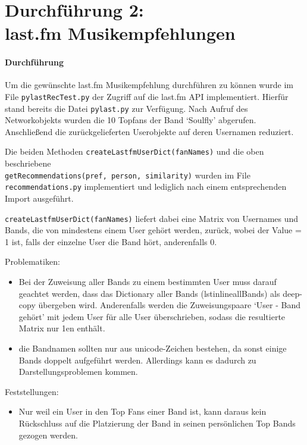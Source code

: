 \documentclass[12pt,a4paper]{scrartcl}
\begin{document}
\part*{Durchf\"uhrung 2: \\last.fm Musikempfehlungen}

\subsection*{Durchf\"uhrung}

Um die gew\"unschte last.fm Musikempfehlung durchf\"uhren zu k\"onnen wurde im File \lstinline{pylastRecTest.py} der Zugriff auf die last.fm API implementiert.
Hierf\"ur stand bereits die Datei \lstinline{pylast.py} zur Verf\"ugung. Nach Aufruf des Networkobjekts wurden die 10 Topfans der Band `Soulfly' abgerufen.
Anschlie\ss end die zur\"uckgelieferten Userobjekte auf deren Usernamen reduziert. 

Die beiden Methoden \lstinline{createLastfmUserDict(fanNames)} und die oben beschriebene\\ \lstinline{getRecommendations(pref, person, similarity)} wurden im File \lstinline{recommendations.py} implementiert und lediglich nach einem entsprechenden Import ausgef\"uhrt.

\lstinline{createLastfmUserDict(fanNames)} liefert dabei eine Matrix von Usernames und Bands, die von mindestens einem User geh\"ort werden, zur\"uck, wobei der Value = 1 ist, falls der einzelne User die Band h\"ort, anderenfalls 0.

Problematiken:
\begin{itemize}
\item Bei der Zuweisung aller Bands zu einem bestimmten User muss darauf geachtet werden, dass das Dictionary aller Bands (lstinline{allBands})  als deep-copy \"ubergeben wird. Anderenfalls werden die Zuweisungspaare `User - Band geh\"ort' mit jedem User f\"ur alle User \"uberschrieben, sodass die resultierte Matrix nur 1en enth\"alt.
\item die Bandnamen sollten nur aus unicode-Zeichen bestehen, da sonst einige Bands doppelt aufgef\"uhrt werden. Allerdings kann es dadurch zu Darstellungsproblemen kommen. 
\end{itemize}

Feststellungen:
\begin{itemize}
\item Nur weil ein User in den Top Fans einer Band ist, kann daraus kein R\"uckschluss auf die Platzierung der Band in seinen pers\"onlichen Top Bands gezogen werden.
\end{itemize}
\end{document}
